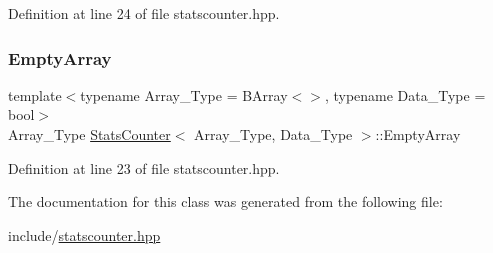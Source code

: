 Definition at line 24 of file statscounter.\+hpp.

\mbox{\label{class_stats_counter_a026304bec607994865ba5bb4e18f9104}} 
\subsubsection{\texorpdfstring{Empty\+Array}{EmptyArray}}
{\footnotesize\ttfamily template$<$typename Array\+\_\+\+Type  = B\+Array$<$$>$, typename Data\+\_\+\+Type  = bool$>$ \\
Array\+\_\+\+Type \hyperlink{class_stats_counter}{Stats\+Counter}$<$ Array\+\_\+\+Type, Data\+\_\+\+Type $>$\+::Empty\+Array}



Definition at line 23 of file statscounter.\+hpp.



The documentation for this class was generated from the following file\+:\begin{DoxyCompactItemize}
\item 
include/\hyperlink{statscounter_8hpp}{statscounter.\+hpp}\end{DoxyCompactItemize}
